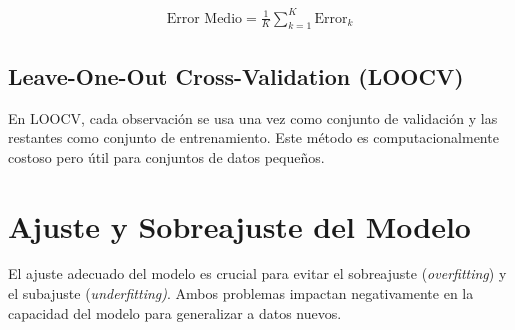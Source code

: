 \documentclass[a4paper]{report} %
\begin{document}
\begin{eqnarray*}
\text{Error Medio} = \frac{1}{K} \sum_{k=1}^{K} \text{Error}_k
\end{eqnarray*}
\subsection{Leave-One-Out Cross-Validation (LOOCV)}
En LOOCV, cada observaci\'on se usa una vez como conjunto de validaci\'on y las restantes como conjunto de entrenamiento. Este m\'etodo es computacionalmente costoso pero \'util para conjuntos de datos peque\~nos.

\section{Ajuste y Sobreajuste del Modelo}

El ajuste adecuado del modelo es crucial para evitar el sobreajuste (\textit{overfitting}) y el subajuste (\textit{underfitting)}. Ambos problemas impactan negativamente en la capacidad del modelo para generalizar a datos nuevos.
\end{document}
